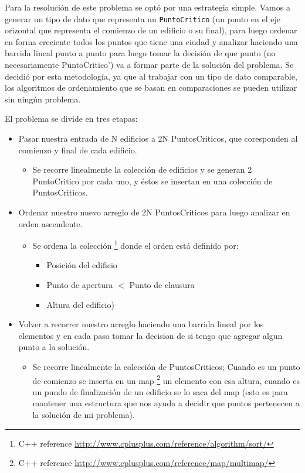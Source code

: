 Para la resolución de este problema se optó por una estrategia simple. Vamos a generar un tipo de dato que representa un \texttt{PuntoCritico} (un punto en el eje orizontal que representa el comienzo de un edificio o su final), para luego ordenar en forma creciente todos los puntos que tiene una ciudad y analizar haciendo una barrida lineal punto a punto para luego tomar la decisi\'on de que punto (no necesariamente PuntoCritico') va a formar parte de la solución del problema.
Se decidió por esta metodología, ya que al trabajar con un tipo de dato comparable, los algoritmos de ordenamiento que se basan en comparaciones se pueden utilizar sin ningún problema.

El problema se divide en tres etapas:

\begin{itemize}
	\item Pasar nuestra entrada de N edificios a 2N PuntosCriticos, que coresponden al comienzo y final de cada edificio.
		\begin{itemize}
		\item  Se recorre linealmente la colección de edificios y se generan 2 PuntoCritico por cada uno, y \'estos se insertan en una colección de PuntosCriticos.
		\end{itemize}
	\item Ordenar nuestro nuevo arreglo de 2N PuntosCriticos para luego analizar en orden ascendente.
		\begin{itemize}
		\item  Se ordena la colecci\'on \footnote{C++ reference \url{http://www.cplusplus.com/reference/algorithm/sort/}} donde el orden está definido por:  
			\begin{itemize}
				\item Posici\'on del edificio
				\item Punto de apertura $<$ Punto de clausura
				\item Altura del edificio)
			\end{itemize}
		\end{itemize}
	\item Volver a recorrer nuestro arreglo haciendo una barrida lineal por los elementos y en cada paso tomar la decision de si tengo que agregar algun punto a la soluci\'on.
	\begin{itemize}
		\item  Se recorre linealmente la colección de PuntosCriticos; Cuando es un punto de comienzo se inserta en un map 
		\footnote{C++ reference \url{http://www.cplusplus.com/reference/map/multimap/}}  un elemento con esa altura, cuando es un pundo de finalizaci\'on de un edificio se lo saca del map (esto es para mantener una estructura que nos ayuda a decidir que puntos pertenecen a la soluci\'on de mi problema).
		\end{itemize}
\end{itemize}



